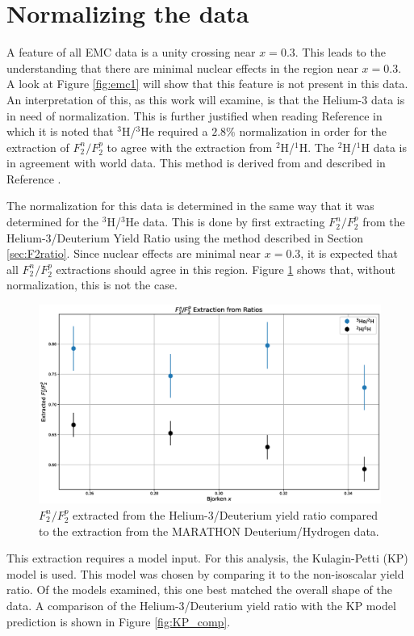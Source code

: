 \section{Normalizing the data}

A feature of all EMC data is a unity crossing near $x=0.3$. This leads to the understanding that there are minimal nuclear effects in the region near $x=0.3$. A look at Figure \ref{fig:emc1} will show that this feature is not present in this data. An interpretation of this, as this work will examine, is that the Helium-3 data is in need of normalization. This is further justified when reading Reference \cite{Su_Thesis} in which it is noted that $^3$H/$^3$He required a $2.8\%$ normalization in order for the extraction of $F_2^n/F_2^p$ to agree with the extraction from $^2$H/$^1$H. The $^2$H/$^1$H data is in agreement with world data. This method is derived from and described in Reference \cite{KP2010}.

The normalization for this data is determined in the same way that it was determined for the $^3$H/$^3$He data. This is done by first extracting $F_2^n/F_2^p$ from the Helium-3/Deuterium Yield Ratio using the method described in Section \ref{sec:F2ratio}. Since nuclear effects are minimal near $x=0.3$, it is expected that all $F_2^n/F_2^p$ extractions should agree in this region. Figure \ref{fig:f2r} shows that, without normalization, this is not the case.

\begin{figure}[p]
	\includegraphics[width=\textwidth]{./results/fig/f2r.eps}
	\caption{$F_2^n/F_2^p$ extracted from the Helium-3/Deuterium yield ratio compared to the extraction from the MARATHON Deuterium/Hydrogen data.}
	\label{fig:f2r}
\end{figure}

This extraction requires a model input. For this analysis, the Kulagin-Petti (KP) model is used. This model was chosen by comparing it to the non-isoscalar yield ratio. Of the models examined, this one best matched the overall shape of the data. A comparison of the Helium-3/Deuterium yield ratio with the KP model prediction is shown in Figure \ref{fig:KP_comp}.

